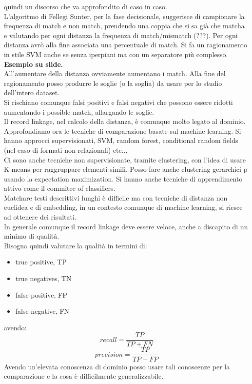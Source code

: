 \documentclass[a4paper,12pt, oneside]{book}
\begin{document}
quindi un discorso che va approfondito di caso in caso.\\
L'algoritmo di Fellegi Sunter, per la fase decisionale, suggerisce di
campionare la frequenza di match e non match, prendendo una coppia che si sa
già che matcha e valutando per ogni distanza la frequenza di match/mismatch
(???). Per ogni distanza avrò alla fine associata una percentuale di match. Si
fa un ragionamento in stile SVM anche se senza iperpiani ma con un separatore
più complesso.\\
\textbf{Esempio su slide.}\\
All'aumentare della distanza ovviamente aumentano i match. Alla fine del
ragionamento posso produrre le soglie (o la soglia) da usare per lo studio
dell'intero dataset.\\
Si rischiano comunque falsi positivi e falsi negativi che possono essere ridotti
aumentando i possible match, allargando le soglie.\\
Il record linkage, nel calcolo della distanza, è comunque molto legato al
dominio.\\
Approfondiamo ora le tecniche di comparazione basate sul machine learning. Si
hanno approcci supervisionati, SVM, random forest, conditional random fields
(nel caso di formati non relazionali) etc$\ldots$ \\
Ci sono anche tecniche non supervisionate, tramite clustering, con l'idea di
usare K-means per raggruppare elementi simili. Posso fare anche clustering
gerarchici p usando la expectation maximization. Si hanno anche tecniche di
apprendimento attivo come il commitee of classifiers.\\
Matchare testi descrittivi lunghi è difficile ma con tecniche di distanza non
euclidea e di embedding, in un contesto comunque di machine learning, si riesce
ad ottenere dei risultati.\\ 
In generale comunque il record linkage deve essere veloce, anche a discapito di
un minimo di qualità.\\
Bisogna quindi valutare la qualità in termini di:
\begin{itemize}
  \item true positive, TP
  \item true negatives, TN
  \item false positive, FP
  \item false negative, FN
\end{itemize}
avendo:
\[recall=\frac{TP}{TP+FN}\]
\[precision=\frac{TP}{TP+FP}\]
Avendo un'elevata conoscenza di dominio posso usare tali conoscenze per la
comparazione e la cosa è difficilmente generalizzabile.
\end{document}
